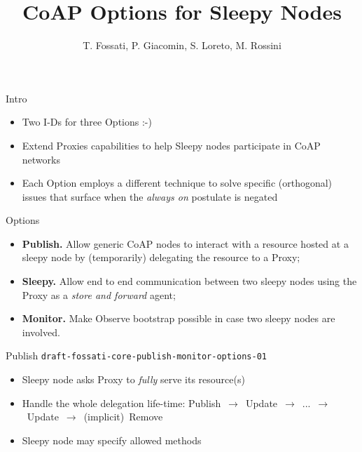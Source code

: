 \documentclass{beamer}
\author{{\scriptsize T. Fossati, P. Giacomin, S. Loreto, M. Rossini}}
\title{CoAP Options for Sleepy Nodes}
\institute{{\large IETF 83, Paris}}
\date{}
\begin{document}
\begin{frame}[plain]
 \titlepage
\end{frame}

\begin{frame}{Intro}

\begin{itemize}
 \item Two I-Ds for three Options :-)
 \item Extend Proxies capabilities to help Sleepy nodes participate in CoAP networks
 \item Each Option employs a different technique to solve specific (orthogonal) issues that surface when the \emph{always on} postulate is negated
\end{itemize}

\end{frame}

\begin{frame}{Options}

\begin{itemize}
 \item \textbf{Publish.}  Allow generic CoAP nodes to interact with a resource hosted at a sleepy node by (temporarily) delegating the resource to a Proxy;
 \vspace{.3cm}
 \item \textbf{Sleepy.}  Allow end to end communication between two sleepy nodes using the Proxy as a \emph{store and forward} agent;
 \vspace{.3cm}
 \item \textbf{Monitor.}  Make Observe bootstrap possible in case two sleepy nodes are involved.
\end{itemize}

\end{frame}


\begin{frame}{Publish \hspace{5cm} {\tiny \texttt{draft-fossati-core-publish-monitor-options-01}}}

\begin{itemize}
 \item Sleepy node asks Proxy to \emph{fully} serve its resource(s)
 \item Handle the whole delegation life-time: \mbox{\small{Publish $\rightarrow$ Update $\rightarrow$ ... $\rightarrow$ Update $\rightarrow$ (implicit) Remove}}
 \item Sleepy node may specify allowed methods %
\end{itemize}

\end{frame}
\end{document}

